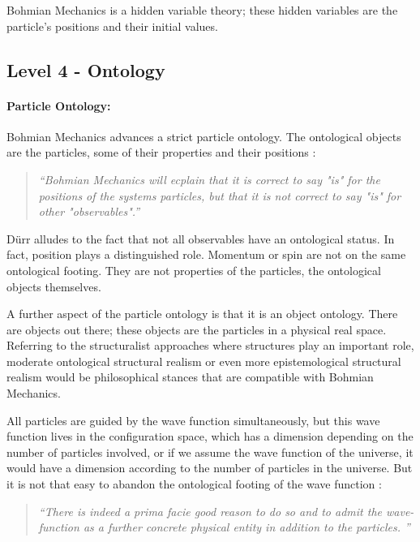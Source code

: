 \documentclass{article}
\begin{document}
Bohmian Mechanics is a hidden variable theory; these hidden variables are the particle's positions and their initial values.  

\subsection*{Level 4 - Ontology}

\paragraph{Particle Ontology:}

Bohmian Mechanics advances a strict particle ontology. The ontological objects are the particles, some of their properties and their positions \cite[p.142]{durr2009bohmian}: 

\begin{quote}
\textit{``Bohmian Mechanics will ecplain that it is correct to say "is" for the positions of the systems particles, but that it is not correct to say "is" for other "observables".''}
\end{quote}

D\"urr alludes to the fact that not all observables have an ontological status. In fact, position plays a distinguished role. Momentum or spin are not on the same ontological footing. They are not properties of the particles, the ontological objects themselves. 

A further aspect of the particle ontology is that it is an object ontology. There are objects out there; these objects are the particles in a physical real space. Referring to the structuralist approaches where structures play an important role, moderate ontological structural realism or even more epistemological structural realism would be philosophical stances that are compatible with Bohmian Mechanics. 

All particles are guided by the wave function simultaneously, but this wave function lives in the configuration space, which has a dimension depending on the number of particles involved, or if we assume the wave function of the universe, it would have a dimension according to the number of particles in the universe. But it is not that easy to abandon the ontological footing of the wave function \cite[p.5-6]{esfeld2013ontology}:

\begin{quote}
\textit{``There is indeed a prima facie good reason to do so and to admit the wave-function as a further concrete physical entity in addition to the particles. ''}
\end{quote}
\end{document}
